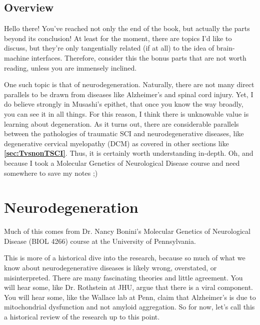 \label{sec:Addendum}

\section*{Overview}

Hello there! You've reached not only the end of the book, but actually the parts beyond its conclusion! At least for the moment, there are topics I'd like to discuss, but they're only tangentially related (if at all) to the idea of brain-machine interfaces. Therefore, consider this the bonus parts that are not worth reading, unless you are immensely inclined.\newline

One such topic is that of neurodegeneration. Naturally, there are not many direct parallels to be drawn from diseases like Alzheimer's and spinal cord injury. Yet, I do believe strongly in Musashi's epithet, that once you know the way broadly, you can see it in all things. For this reason, I think there is unknowable value is learning about degeneration. As it turns out, there are considerable parallels between the pathologies of traumatic SCI and neurodegenerative diseases, like degenerative cervical myelopathy (DCM) as covered in other sections like \textbf{\ref{sec:TvsnonTSCI}}. Thus, it is certainly worth understanding in-depth. Oh, and because I took a Molecular Genetics of Neurological Disease course and need somewhere to save my notes ;) 




\chapter{Neurodegeneration}

Much of this comes from Dr. Nancy Bonini's Molecular Genetics of Neurological Disease (BIOL 4266) course at the University of Pennsylvania.\newline

This is more of a historical dive into the research, because so much of what we know about neurodegenerative diseases is likely wrong, overstated, or misinterpreted. There are many fascinating theories and little agreement. You will hear some, like Dr. Rothstein at JHU, argue that there is a viral component. You will hear some, like the Wallace lab at Penn, claim that Alzheimer's is due to mitochondrial dysfunction and not amyloid aggregation. So for now, let's call this a historical review of the research up to this point.\newline

